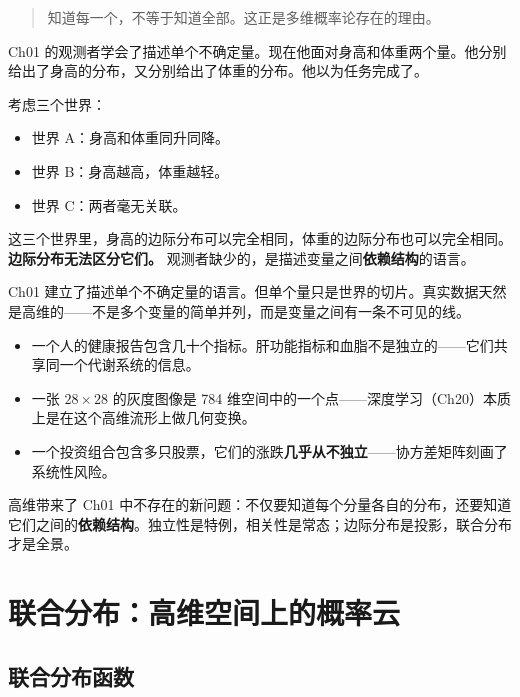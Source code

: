 \documentclass[
]{book}
\providecommand{\tightlist}{%
  \setlength{\itemsep}{0pt}\setlength{\parskip}{0pt}}
\begin{document}
\begin{quote}
知道每一个，不等于知道全部。这正是多维概率论存在的理由。
\end{quote}

Ch01 的观测者学会了描述单个不确定量。现在他面对身高和体重两个量。他分别给出了身高的分布，又分别给出了体重的分布。他以为任务完成了。

考虑三个世界：

\begin{itemize}
\tightlist
\item
  世界 A：身高和体重同升同降。
\item
  世界 B：身高越高，体重越轻。
\item
  世界 C：两者毫无关联。
\end{itemize}

这三个世界里，身高的边际分布可以完全相同，体重的边际分布也可以完全相同。\textbf{边际分布无法区分它们。} 观测者缺少的，是描述变量之间\textbf{依赖结构}的语言。

Ch01 建立了描述单个不确定量的语言。但单个量只是世界的切片。真实数据天然是高维的------不是多个变量的简单并列，而是变量之间有一条不可见的线。

\begin{itemize}
\tightlist
\item
  一个人的健康报告包含几十个指标。肝功能指标和血脂不是独立的------它们共享同一个代谢系统的信息。
\item
  一张 \(28 \times 28\) 的灰度图像是 784 维空间中的一个点------深度学习（Ch20）本质上是在这个高维流形上做几何变换。
\item
  一个投资组合包含多只股票，它们的涨跌\textbf{几乎从不独立}------协方差矩阵刻画了系统性风险。
\end{itemize}

高维带来了 Ch01 中不存在的新问题：不仅要知道每个分量各自的分布，还要知道它们之间的\textbf{依赖结构}。独立性是特例，相关性是常态；边际分布是投影，联合分布才是全景。

\section{联合分布：高维空间上的概率云}\label{ux8054ux5408ux5206ux5e03ux9ad8ux7ef4ux7a7aux95f4ux4e0aux7684ux6982ux7387ux4e91}

\subsection{联合分布函数}\label{ux8054ux5408ux5206ux5e03ux51fdux6570}
\end{document}
